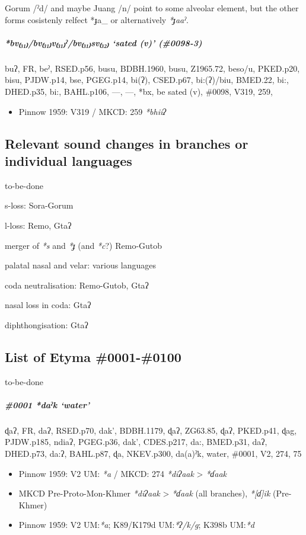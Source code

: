 \documentclass[a4paper,]{article}
\providecommand{\tightlist}{%
  \setlength{\itemsep}{0pt}\setlength{\parskip}{0pt}}
\let\oldsubparagraph\subparagraph
\renewcommand{\subparagraph}[1]{\oldsubparagraph{#1}\mbox{}}
\begin{document}
Gorum /ˀd/ and maybe Juang /n/ point to some alveolar element, but the
other forms cosistenly relfect *ɟa\_ or alternatively \emph{*ɟaaˀ}.

\subparagraph{\texorpdfstring{\emph{*bv₍₃₁₎/bv₍₃₁₎v₍₃₁₎ˀ/bv₍₃₁₎sv₍₃₂₎}
`sated (v)'
(\#0098-3)}{*bv₍₃₁₎/bv₍₃₁₎v₍₃₁₎ˀ/bv₍₃₁₎sv₍₃₂₎ sated (v) (\#0098-3)}}\label{bvbvvux2c0bvsv-sated-v-0098-3-1}

buʔ, FR, beˀ, RSED.p56, busu, BDBH.1960, busu, Z1965.72, beso/u,
PKED.p20, bisu, PJDW.p14, bse, PGEG.p14, bi(ʔ), CSED.p67, bi:(ʔ)/biu,
BMED.22, bi:, DHED.p35, bi:, BAHL.p106, ---, ---, *bx, be sated (v),
\#0098, V319, 259,

\begin{itemize}
\tightlist
\item
  Pinnow 1959: V319 / MKCD: 259 \emph{*bhiiʔ}
\end{itemize}

\subsection{Relevant sound changes in branches or individual
languages}\label{relevant-sound-changes-in-branches-or-individual-languages}

to-be-done

s-loss: Sora-Gorum

l-loss: Remo, Gtaʔ

merger of \emph{*s} and \emph{*ɟ} (and \emph{*c}?) Remo-Gutob

palatal nasal and velar: various languages

coda neutralisation: Remo-Gutob, Gtaʔ

nasal loss in coda: Gtaʔ

diphthongisation: Gtaʔ

\subsection{List of Etyma \#0001-\#0100}\label{list-of-etyma-0001-0100}

to-be-done

\subparagraph{\texorpdfstring{\#0001 \emph{*daˀk}
`water'}{\#0001 *daˀk water}}\label{daux2c0k-water}

ɖaʔ, FR, daʔ, RSED.p70, dak', BDBH.1179, ɖaʔ, ZG63.85, ɖaʔ, PKED.p41,
ɖag, PJDW.p185, ndiaʔ, PGEG.p36, dak', CDES.p217, da:, BMED.p31, daʔ,
DHED.p73, da:ʔ, BAHL.p87, ɖa, NKEV.p300, da(a)ˀk, water, \#0001, V2,
274, 75

\begin{itemize}
\item
  Pinnow 1959: V2 UM: \emph{*a} / MKCD: 274 \emph{*diʔaak}
  \textgreater{} \emph{*ɗaak}
\item
  MKCD Pre-Proto-Mon-Khmer \emph{*diʔaak} \textgreater{} \emph{*ɗaak}
  (all branches), \emph{*{[}ɗ{]}ik} (Pre-Khmer)
\item
  Pinnow 1959: V2 UM:\emph{*a}; K89/K179d UM:\emph{*ʔ/k/g}; K398b
  UM:\emph{*d}
\end{itemize}
\end{document}
